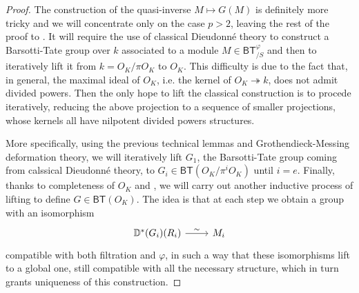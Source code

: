 \begin{proof}
The construction of the quasi-inverse $M \mapsto G(M)$
is definitely more tricky and we will concentrate only on
the case $p > 2$, leaving the rest of the proof to \cite{Kisin}.
It will require the use of classical Dieudonné theory to construct a
Barsotti-Tate group over $k$ associated to a module $M \in \mathsf{BT}^{\varphi}_{/S}$
and then to iteratively lift it from $k = O_K/\pi O_K$ to $O_K$.
This difficulty is due to the fact that, in general, the maximal
ideal of $O_K$, i.e. the kernel of $O_K \twoheadrightarrow k$, 
does not admit divided powers.
Then the only hope to lift the classical construction is to
procede iteratively, reducing the above projection to a sequence of
smaller projections, whose kernels all have nilpotent divided powers structures.

More specifically, using the previous technical lemmas and Grothendieck-Messing deformation theory,
we will iteratively lift $G_1$, the Barsotti-Tate group coming from calssical Dieudonné theory,
to $G_i \in \mathsf{BT}(O_K/\pi^iO_K)$ until $i = e$.
Finally, thanks to completeness of $O_K$ and \cite[Lemma 2.4.4]{deJong},
we will carry out another inductive process of lifting
to define $G \in \mathsf{BT}(O_K)$.
The idea is that at each step we obtain a group with an isomorphism
\begin{equation*}
\begin{tikzcd}[row sep = 0ex
	,/tikz/column 1/.append style={anchor=base east}
	,/tikz/column 2/.append style={anchor=base west}]
	\mathbb{D}^*(G_i)(R_i) \arrow[r, "\sim", rightarrow] &
	M_i
\end{tikzcd}
\end{equation*} 
compatible with both filtration and $\varphi$, in such a way that these isomorphisms
lift to a global one, still compatible with all the necessary structure,
which in turn grants uniqueness of this construction.


\end{proof}
